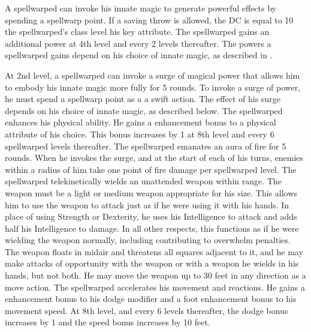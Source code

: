  A spellwarped can invoke his innate magic to generate powerful effects by spending a spellwarp point. If a saving throw is allowed, the DC is equal to 10 \add the spellwarped's class level \add his key attribute. The spellwarped gains an additional power at 4th level and every 2 levels thereafter. The powers a spellwarped gains depend on his choice of innate magic, as described in .

 At 2nd level, a spellwarped can invoke a surge of magical power that allows him to embody his innate magic more fully for 5 rounds. To invoke a surge of power, he must spend a spellwarp point as a a swift action. The effect of his surge depends on his choice of innate magic, as described below.
 The spellwarped enhances his physical ability. He gains a  enhancement bonus to a physical attribute of his choice. This bonus increases by 1 at 8th level and every 6 spellwarped levels thereafter.
 The spellwarped emanates an aura of fire for 5 rounds. When he invokes the surge, and at the start of each of his turns, enemies within a \areasmall radius of him take one point of fire damage per spellwarped level.
 The spellwarped telekinetically wields an unattended weapon within \rngclose range. The weapon must be a light or medium weapon appropriate for his size. This allows him to use the weapon to attack just as if he were using it with his hands. In place of using Strength or Dexterity, he uses his Intelligence to attack and adds half his Intelligence to damage. In all other respects, this functions as if he were wielding the weapon normally, including contributing to overwhelm penalties. The weapon floats in midair and threatens all squares adjacent to it, and he may make attacks of opportunity with the weapon or with a weapon he wields in his hands, but not both. He may move the weapon up to 30 feet in any direction as a move action.
 The spellwarped accelerates his movement and reactions. He gains a  enhancement bonus to his dodge modifier and a  foot enhancement bonus to his movement speed. At 8th level, and every 6 levels thereafter, the dodge bonus increases by 1 and the speed bonus increases by 10 feet.

